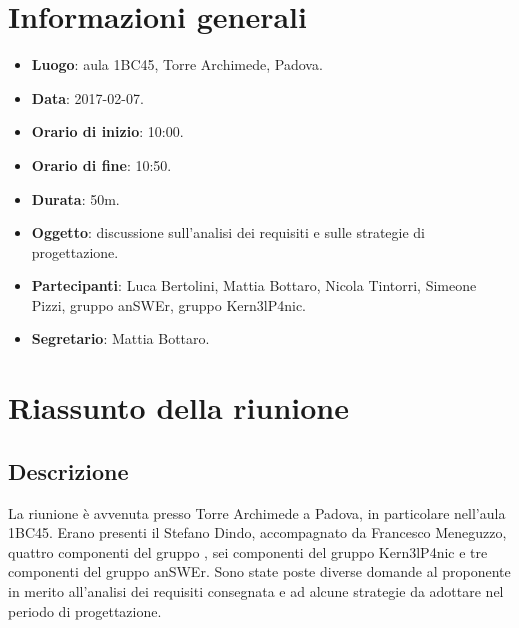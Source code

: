 \documentclass[a4paper,titlepage]{article}
\begin{document}
\maketitle
\begin{diario}
\end{diario}
\newpage
\tableofcontents

\newpage
\section{Informazioni generali}
\label{sec:Informazioni}

\begin{itemize}
  \item \textbf{Luogo}: aula 1BC45, Torre Archimede, Padova.
  \item \textbf{Data}: 2017-02-07.
  \item \textbf{Orario di inizio}: 10:00.
  \item \textbf{Orario di fine}: 10:50.
  \item \textbf{Durata}: 50m.
  \item \textbf{Oggetto}: discussione sull'analisi dei requisiti e sulle strategie di progettazione.
  \item \textbf{Partecipanti}: Luca Bertolini, Mattia Bottaro, Nicola Tintorri, Simeone Pizzi, gruppo anSWEr, gruppo Kern3lP4nic.
  \item \textbf{Segretario}: Mattia Bottaro.

\end{itemize}
\section{Riassunto della riunione}
\label{sec:RiassuntoRiunione}
 \subsection{Descrizione}
La riunione è avvenuta presso Torre Archimede a Padova, in particolare nell'aula 1BC45. Erano presenti il  Stefano Dindo, accompagnato da Francesco Meneguzzo, quattro componenti del gruppo \GRUPPO{}, sei componenti del gruppo Kern3lP4nic e tre componenti del gruppo anSWEr. Sono state poste diverse domande al proponente in merito all'analisi dei requisiti consegnata e ad alcune strategie da adottare nel periodo di progettazione.
\end{document}
